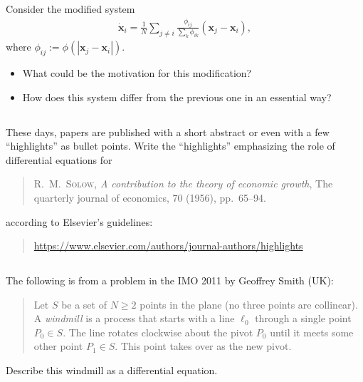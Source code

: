 \documentclass[12pt,a4paper]{article}
\begin{document}
    Consider the modified system 
    \begin{align}
        \dot{\mathbf{x}}_i
        =
        \frac{1}{N}
        \sum_{j \neq i}
        \frac{ \phi_{i j} }{ \sum_k \phi_{i k} }
        ( \mathbf{x}_j - \mathbf{x}_i )
        ,
    \end{align}
    where $\phi_{i j} := \phi(| \mathbf{x}_j - \mathbf{x}_i |)$.
    
    \begin{itemize}
    \item 
        What could be the motivation for this modification?
    \item
        How does this system differ from the previous one in an essential way?
    \end{itemize}

    

    

    

    
    \subsection{}
    
    These days, papers are published with a short abstract
    or even with a few ``highlights'' as bullet points. 
    Write the ``highlights''
    emphasizing the role of differential equations for 
    \begin{quote}
        \textsc{R.~M.~Solow},
        \emph{A contribution to the theory of economic growth},
        The quarterly journal of economics, 70 (1956), pp.~65--94.
    \end{quote}
    according to Elsevier's guidelines: 
    \begin{quote}
        {\small\url{https://www.elsevier.com/authors/journal-authors/highlights}}
    \end{quote}
    
    

    \subsection{}
    
    The following is from a problem 
    in the IMO 2011
    by Geoffrey Smith (UK):
    \begin{quote}
        Let $S$ be a set of $N \geq 2$ points in the plane (no three points are collinear). 
        A \emph{windmill} 
        is a process that 
        starts with a line $\ell_0$ through a single point $P_0 \in S$. 
        The line rotates clockwise about the pivot $P_0$ until 
        it meets some other point $P_1 \in S$. 
        This point takes over as the new pivot.
    \end{quote}
    Describe this windmill as a differential equation.
    
\end{document}
